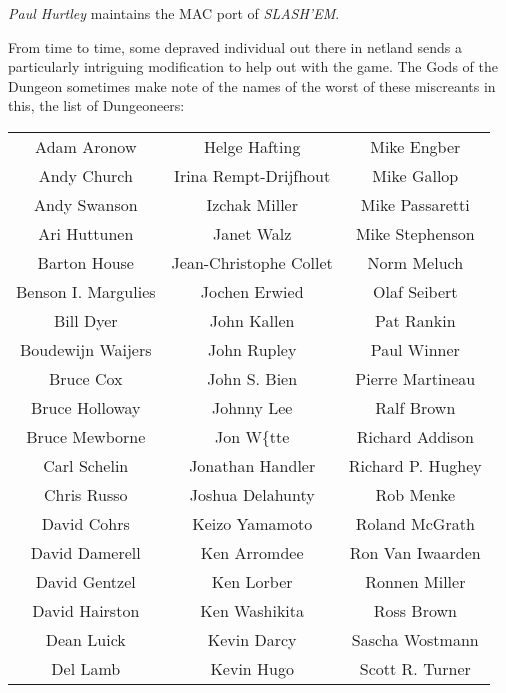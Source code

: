 {\it Paul Hurtley\/} maintains the MAC port of {\it SLASH'EM}.

			  \bigskip

From time to time, some depraved individual out there in netland sends a
particularly intriguing modification to help out with the game.  The Gods of
the Dungeon sometimes make note of the names of the worst of these miscreants
in this, the list of Dungeoneers:

\begin{center}
\begin{tabular}{ccc}
    Adam Aronow     &     Helge Hafting      &    Mike Engber   \\
    Andy Church     & Irina Rempt-Drijfhout  &    Mike Gallop   \\
   Andy Swanson     &     Izchak Miller      &  Mike Passaretti \\
   Ari Huttunen     &       Janet Walz       &  Mike Stephenson \\
   Barton House     & Jean-Christophe Collet &    Norm Meluch   \\
Benson I. Margulies &     Jochen Erwied      &   Olaf Seibert   \\
     Bill Dyer      &      John Kallen       &    Pat Rankin    \\
 Boudewijn Waijers  &      John Rupley       &    Paul Winner   \\
     Bruce Cox      &      John S. Bien      & Pierre Martineau \\
  Bruce Holloway    &       Johnny Lee       &    Ralf Brown    \\
  Bruce Mewborne    &       Jon W\{tte       &  Richard Addison \\
   Carl Schelin     &    Jonathan Handler    & Richard P. Hughey\\
    Chris Russo     &    Joshua Delahunty    &     Rob Menke    \\
    David Cohrs     &     Keizo Yamamoto     &  Roland McGrath  \\
  David Damerell    &      Ken Arromdee      & Ron Van Iwaarden \\
   David Gentzel    &       Ken Lorber       &   Ronnen Miller  \\
  David Hairston    &     Ken Washikita      &    Ross Brown    \\
    Dean Luick      &      Kevin Darcy       &  Sascha Wostmann \\
     Del Lamb       &       Kevin Hugo       &  Scott R. Turner \\

\end{tabular}
\end{center}
